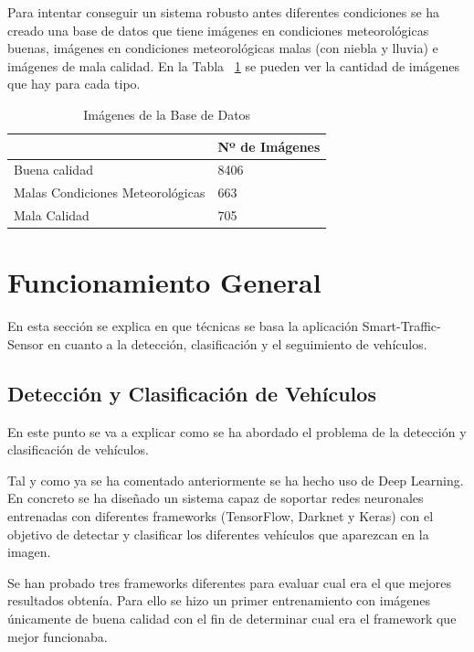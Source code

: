 Para intentar conseguir un sistema robusto antes diferentes condiciones se ha creado una base de datos que tiene imágenes en condiciones meteorológicas buenas, imágenes en condiciones meteorológicas malas (con niebla y lluvia) e imágenes de mala calidad. En la Tabla ~\ref{tabla_img_base_datos} se pueden ver la cantidad de imágenes que hay para cada tipo.
\begin{table}[htb][H] 
\begin{center}
\begin{tabular}{|l|l|}
\hline
\cline{2-2}& Nº de Imágenes\\
\hline \hline
Buena calidad & 8406 \\ \hline
Malas Condiciones Meteorológicas & 663\\ \hline
Mala Calidad & 705\\ \hline
\end{tabular}
\caption{Imágenes de la Base de Datos}
\label{tabla_img_base_datos}
\end{center}
\end{table}

\section{Funcionamiento General}

En esta sección se explica en que técnicas se basa la aplicación Smart-Traffic-Sensor en cuanto a la detección, clasificación y el seguimiento de vehículos.

\subsection{Detección y Clasificación de Vehículos}

En este punto se va a explicar como se ha abordado el problema de la detección y clasificación de vehículos.

Tal y como ya se ha comentado anteriormente se ha hecho uso de Deep Learning. En concreto se ha diseñado un sistema capaz de soportar redes neuronales entrenadas con diferentes frameworks (TensorFlow, Darknet y Keras) con el objetivo de detectar y clasificar los diferentes vehículos que aparezcan en la imagen.

Se han probado tres frameworks diferentes para evaluar cual era el que mejores resultados obtenía. Para ello se hizo un primer entrenamiento con imágenes únicamente de buena calidad con el fin de determinar cual era el framework que mejor funcionaba.

